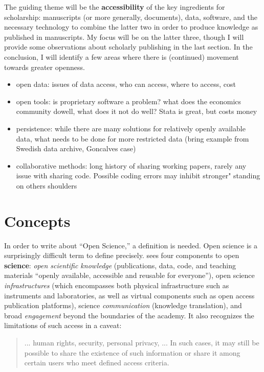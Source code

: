 \documentclass{article}
\begin{document}
The guiding theme will be the \textbf{accessibility} of the key ingredients for scholarship: manuscripts (or more generally, documents), data, software, and the necessary technology to combine the latter two in order to produce knowledge as published in manuscripts. My focus will be on the latter three, though I will provide some observations about scholarly publishing in the last section.
In the conclusion, I will identify a few areas where there is (continued) movement towards greater openness. 


\begin{itemize}
\item open data: issues of data access, who can access, where to access, cost
\item open tools: is proprietary software a problem? what does the economics community dowell, what does it not do well? Stata is great, but costs money
\item persistence: while there are many solutions for relatively openly available data, what needs to be done for more restricted data (bring example from Swedish data archive, Goncalves case)
\item collaborative methods: long history of sharing working papers, rarely any issue with sharing code. Possible coding errors may inhibit stronger" standing on others shoulders
\end{itemize}

\section{Concepts}

In order to write about ``Open Science,'' a definition is needed. Open science is a surprisingly difficult term to define precisely. 
%
\citet{unesco_understanding_2022} sees four components to open \textbf{science}: \textit{open   scientific   knowledge }(publications, data, code, and teaching materials ``openly    available, accessible and reusable for everyone''),     open     science     \textit{infrastructures} (which encompasses both physical infrastructure such as instruments and laboratories, as well as virtual components such as open access publication platforms),     science     \textit{communication} (knowledge translation),  and broad \textit{engagement} beyond the boundaries of the academy. It also recognizes the limitations of such access in a caveat: 

\begin{quote}

...  human rights, security, personal privacy, ... In such  cases,  it  may  still  be  possible  to  share  the  existence  of  such  information or share it among certain users who meet defined access criteria.
    
\end{quote}
\end{document}
